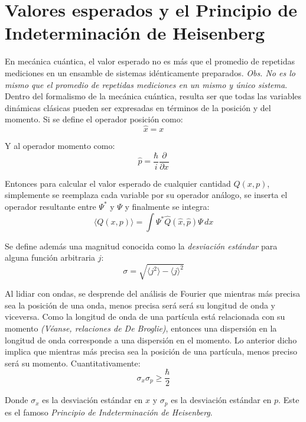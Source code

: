 \section{Valores esperados y el Principio de Indeterminación de Heisenberg}
\label{Valores esperados y el Principio de Indeterminación de Heisenberg}

En mecánica cuántica, el valor esperado no es más que el promedio de repetidas mediciones en un ensamble de sistemas 
idénticamente preparados. \emph{Obs. No es lo mismo que el promedio de repetidas mediciones en un mismo y 
único sistema}. \\
Dentro del formalismo de la mecánica cuántica, resulta ser que todas las variables dinámicas clásicas pueden ser expresadas 
en términos de la posición y del momento. Si se define el operador posición como:
\begin{equation}
    \hat{x} = x
\end{equation}

Y al operador momento como:
\begin{equation}
    \hat{p} = \frac{\hbar}{i} \frac{\partial}{\partial x}
\end{equation}

Entonces para calcular el valor esperado de cualquier cantidad $Q(x,p)$, simplemente se reemplaza cada variable por su 
operador análogo, se inserta el operador resultante entre $\Psi^*$ y $\Psi$ y finalmente se integra:
\begin{equation}
    \langle Q(x,p) \rangle = \int \Psi^* \hat{Q}(\hat{x},\hat{p}) \Psi \, dx
\end{equation}

Se define además una magnitud conocida como la \emph{desviación estándar} para alguna función arbitraria $j$:
\begin{equation}
    \sigma = \sqrt{\langle j^2 \rangle - \langle j \rangle^2}
\end{equation}

Al lidiar con ondas, se desprende del análisis de Fourier que mientras más precisa sea la posición de una onda, menos 
precisa será será su longitud de onda y viceversa. Como la longitud de onda de una partícula está relacionada con su 
momento \emph{(Véanse, relaciones de De Broglie)}, entonces una dispersión en la longitud de onda corresponde a una 
dispersión en el momento. Lo anterior dicho implica que mientras más precisa sea la posición de una partícula, menos preciso 
será su momento. Cuantitativamente:
\begin{equation}
    \sigma_{x} \sigma_{p} \geq \frac{\hbar}{2}
\end{equation}

Donde $\sigma_{x}$ es la desviación estándar en $x$ y $\sigma_{p}$ es la desviación estándar en $p$. Este es el famoso 
\emph{Principio de Indeterminación de Heisenberg}.